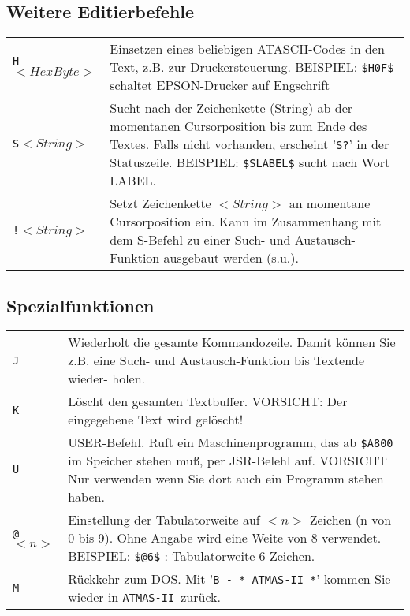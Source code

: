 \documentclass[10pt,a4paper,twoside,final,openright,titlepage]{memoir}
\newcommand{\foo}[1]{\ensuremath{< \!\! #1 \!\! >}}
\def\atmas{\texttt{AT\-MAS-II }}
\begin{document}
\subsection{Weitere Editierbefehle}

\renewcommand{\arraystretch}{1.8}
\begin{tabular}{lp{25em}}
\texttt{H}\foo{HexByte} & Einsetzen eines beliebigen ATASCII-Codes
		in den Text, z.B. zur Druckersteuerung.
		BEISPIEL: \texttt{\$H0F\$} schaltet EPSON-Drucker
			  auf Engschrift \\

\texttt{S}\foo{String} & 	Sucht nach der Zeichenkette (String) ab
		der momentanen Cursorposition bis zum
		Ende des Textes. Falls nicht vorhanden,
		erscheint '\texttt{S?}' in der Statuszeile.
		BEISPIEL: \texttt{\$SLABEL\$} sucht nach Wort LABEL. \\

\texttt{!}\foo{String} & 	Setzt Zeichenkette \foo{String} an momentane
		Cursorposition ein. Kann im Zusammenhang
		mit dem S-Befehl zu einer Such- und
		Austausch-Funktion ausgebaut werden (s.u.).
\end{tabular}

\subsection{Spezialfunktionen}

\begin{tabular}{lp{25em}}
\texttt{J} & 		Wiederholt die gesamte Kommandozeile.
		Damit können Sie z.B. eine Such- und
		Austausch-Funktion bis Textende wieder-
		holen. \\

\texttt{K} & 		Löscht den gesamten Textbuffer.
		VORSICHT: Der eingegebene Text wird
		gelöscht! \\

\texttt{U} & 		USER-Befehl. Ruft ein Maschinenprogramm,
		das ab \texttt{\$A800} im Speicher stehen muß, per
		JSR-Belehl auf. VORSICHT Nur verwenden
		wenn Sie dort auch ein Programm stehen
		haben. \\

\texttt{@}\foo{n} & 		Einstellung der Tabulatorweite auf \foo{n}
		Zeichen (n von 0 bis 9). Ohne Angabe
		wird eine Weite von 8 verwendet.
		BEISPIEL: \texttt{\$@6\$} : Tabulatorweite 6 Zeichen. \\

\texttt{M} & 		Rückkehr zum DOS. Mit '\texttt{B - * \atmas *}'
		kommen Sie wieder in \atmas zurück. \\
\end{tabular}
\end{document}

